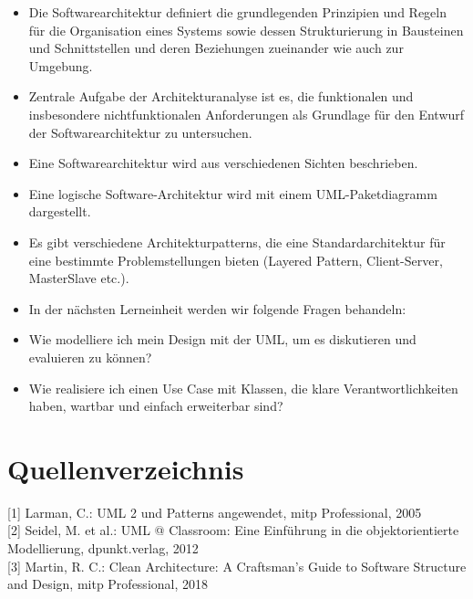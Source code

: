 \documentclass[10pt]{article}
\begin{document}
\begin{itemize}
  \item Die Softwarearchitektur definiert die grundlegenden Prinzipien und Regeln für die Organisation eines Systems sowie dessen Strukturierung in Bausteinen und Schnittstellen und deren Beziehungen zueinander wie auch zur Umgebung.
  \item Zentrale Aufgabe der Architekturanalyse ist es, die funktionalen und insbesondere nichtfunktionalen Anforderungen als Grundlage für den Entwurf der Softwarearchitektur zu untersuchen.
  \item Eine Softwarearchitektur wird aus verschiedenen Sichten beschrieben.
  \item Eine logische Software-Architektur wird mit einem UML-Paketdiagramm dargestellt.
  \item Es gibt verschiedene Architekturpatterns, die eine Standardarchitektur für eine bestimmte Problemstellungen bieten (Layered Pattern, Client-Server, MasterSlave etc.).
  \item In der nächsten Lerneinheit werden wir folgende Fragen behandeln:
  \item Wie modelliere ich mein Design mit der UML, um es diskutieren und evaluieren zu können?
  \item Wie realisiere ich einen Use Case mit Klassen, die klare Verantwortlichkeiten haben, wartbar und einfach erweiterbar sind?
\end{itemize}

\section*{Quellenverzeichnis}
[1] Larman, C.: UML 2 und Patterns angewendet, mitp Professional, 2005\\[0pt]
[2] Seidel, M. et al.: UML @ Classroom: Eine Einführung in die objektorientierte Modellierung, dpunkt.verlag, 2012\\[0pt]
[3] Martin, R. C.: Clean Architecture: A Craftsman's Guide to Software Structure and Design, mitp Professional, 2018
\end{document}
